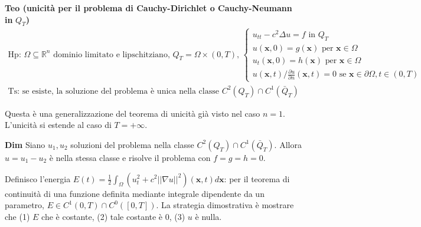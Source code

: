 \documentclass{article}
\begin{document}
\textbf{Teo (unicit\`{a} per il problema di Cauchy-Dirichlet o
Cauchy-Neumann in }$Q_{T}$\textbf{)}%
\begin{gather*}
\text{Hp: }\Omega \subseteq 
\mathbb{R}
^{n}\text{ dominio limitato e lipschitziano, }Q_{T}=\Omega \times \left(
0,T\right) \text{, }\left\{ 
\begin{array}{c}
u_{tt}-c^{2}\Delta u=f\text{ in }Q_{T} \\ 
u\left( \mathbf{x},0\right) =g\left( \mathbf{x}\right) \text{ per }\mathbf{x}%
\in \Omega \\ 
u_{t}\left( \mathbf{x},0\right) =h\left( \mathbf{x}\right) \text{ per }%
\mathbf{x}\in \Omega \\ 
u\left( \mathbf{x},t\right) /\frac{\partial u}{\partial n}\left( \mathbf{x}%
,t\right) =0\text{ se }\mathbf{x}\in \partial \Omega ,t\in \left( 0,T\right)%
\end{array}%
\right. \\
\text{Ts: se esiste, la soluzione del problema \`{e} unica nella classe }%
C^{2}\left( Q_{T}\right) \cap C^{1}\left( \bar{Q}_{T}\right) \text{ }
\end{gather*}

Questa \`{e} una generalizzazione del teorema di unicit\`{a} gi\`{a} visto
nel caso $n=1$. L'unicit\`{a} si estende al caso di $T=+\infty $.

\textbf{Dim} Siano $u_{1},u_{2}$ soluzioni del problema nella classe $%
C^{2}\left( Q_{T}\right) \cap C^{1}\left( \bar{Q}_{T}\right) $. Allora $%
u=u_{1}-u_{2}$ \`{e} nella stessa classe e risolve il problema con $f=g=h=0$.

Definisco l'energia $E\left( t\right) =\frac{1}{2}\int_{\Omega }\left(
u_{t}^{2}+c^{2}\left\vert \left\vert \nabla u\right\vert \right\vert
^{2}\right) \left( \mathbf{x},t\right) d\mathbf{x}$: per il teorema di
continuit\`{a} di una funzione definita mediante integrale dipendente da un
parametro, $E\in C^{1}\left( 0,T\right) \cap C^{0}\left( \left[ 0,T\right]
\right) $. La strategia dimostrativa \`{e} mostrare che (1) $E$ che \`{e}
costante, (2) tale costante \`{e} $0$, (3) $u$ \`{e} nulla.
\end{document}
